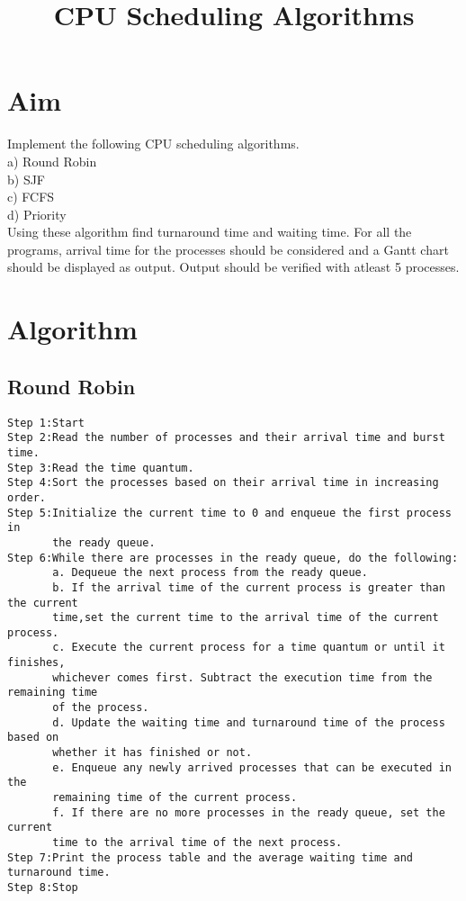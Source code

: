 \documentclass{article}
\title{\textbf {CPU Scheduling Algorithms}}
\date{\vspace{-5ex}}
\begin{document}
\maketitle
\thispagestyle{first}
\pagestyle{third}
\section*{\Large Aim}
Implement the following CPU scheduling algorithms.\\
a) Round Robin\\
b) SJF\\
c) FCFS\\
d) Priority\\
Using these algorithm find turnaround time and waiting time. For all
the programs, arrival time for the processes should be considered and
a Gantt chart should be displayed as output. Output should be verified
with atleast 5 processes.\\
\section{\Large Algorithm}

\subsection{Round Robin}
\begin{Verbatim}[tabsize = 4]
Step 1:Start
Step 2:Read the number of processes and their arrival time and burst time.
Step 3:Read the time quantum.
Step 4:Sort the processes based on their arrival time in increasing order.
Step 5:Initialize the current time to 0 and enqueue the first process in 
       the ready queue.
Step 6:While there are processes in the ready queue, do the following:
       a. Dequeue the next process from the ready queue.
       b. If the arrival time of the current process is greater than the current 
       time,set the current time to the arrival time of the current process.
       c. Execute the current process for a time quantum or until it finishes,
       whichever comes first. Subtract the execution time from the remaining time 
       of the process.
       d. Update the waiting time and turnaround time of the process based on 
       whether it has finished or not.
       e. Enqueue any newly arrived processes that can be executed in the 
       remaining time of the current process.
       f. If there are no more processes in the ready queue, set the current 
       time to the arrival time of the next process.
Step 7:Print the process table and the average waiting time and turnaround time.
Step 8:Stop

\end{Verbatim}
\end{document}
